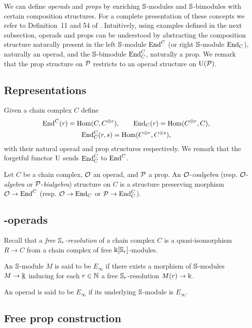 We can define \textit{operads} and \textit{props} by enriching $\S$-modules and $\S$-bimodules with certain composition structures.
For a complete presentation of these concepts we refer to Definition~11 and 54 of \cite{markl2008props}.
Intuitively, using examples defined in the next subsection, operads and props can be understood by abstracting the composition structure naturally present in the left $\S$-module $\End^C$ (or right $\S$-module $\End_C$), naturally an operad, and the $\S$-bimodule $\End^C_C$, naturally a prop.
We remark that the prop structure on $\cP$ restricts to an operad structure on $\forget(\cP)$.

\subsection{Representations}

Given a chain complex $C$ define
\begin{gather*}
\End^C(r) = \Hom(C, C^{\otimes r}), \qquad
\End_C(r) = \Hom(C^{\otimes r}, C), \\
\End^C_C(r, s) = \Hom(C^{\otimes r}, C^{\otimes s}),
\end{gather*}
with their natural operad and prop structures respectively.
We remark that the forgetful functor $\forget$ sends $\End^C_C$ to $\End^C$.

Let $C$ be a chain complex, $\cO$ an operad, and $\cP$ a prop.
An $\cO$-\textit{coalgebra} (resp. $\cO$-\textit{algebra} or $\cP$-\textit{bialgebra}) structure on $C$ is a structure preserving morphism $\cO \to \End^C$ (resp. $\cO \to \End_C$ or $\cP \to \End_C^C$).

\subsection{\pdfEinfty-operads}

Recall that a \textit{free $\S_r$-resolution} of a chain complex $C$ is a quasi-isomorphism $R \to C$ from a chain complex of free $\k[\S_r]$-modules.

An $\S$-module $M$ is said to be $E_{\infty}$ if there exists a morphism of $\S$-modules $M \to \underline{\k}$ inducing for each $r \in \N$ a free $\S_r$-resolution $M(r) \to \k$.

An operad is said to be $E_{\infty}$ if its underlying $\S$-module is $E_\infty$.

\subsection{Free prop construction} \label{ss:free prop}

